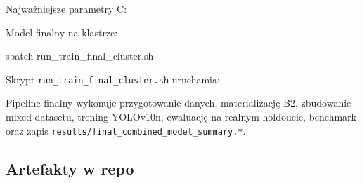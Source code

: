 \documentclass[
  11pt,
]{article}
\newenvironment{Shaded}{}{}
\newcommand{\AttributeTok}[1]{\textcolor[rgb]{0.49,0.56,0.16}{#1}}
\newcommand{\DataTypeTok}[1]{\textcolor[rgb]{0.56,0.13,0.00}{#1}}
\newcommand{\ExtensionTok}[1]{#1}
\newcommand{\NormalTok}[1]{#1}
\newcommand{\VariableTok}[1]{\textcolor[rgb]{0.10,0.09,0.49}{#1}}
\begin{document}
Najważniejsze parametry C:

\begin{Shaded}
\end{Shaded}

Model finalny na klastrze:

\begin{Shaded}
\begin{Highlighting}[]
\ExtensionTok{sbatch}\NormalTok{ run\_train\_final\_cluster.sh}
\end{Highlighting}
\end{Shaded}

Skrypt \texttt{run\_train\_final\_cluster.sh} uruchamia:

\begin{Shaded}
\end{Shaded}

Pipeline finalny wykonuje przygotowanie danych, materializację B2,
zbudowanie mixed datasetu, trening YOLOv10n, ewaluację na realnym
holdoucie, benchmark oraz zapis
\texttt{results/final\_combined\_model\_summary.*}.

\hypertarget{artefakty-w-repo}{%
\subsection{Artefakty w repo}\label{artefakty-w-repo}}
\end{document}
